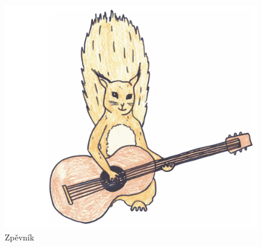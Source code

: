 \documentclass[a5paper, 10pt, onecolumn]{article}
\begin{document}



\begin{titlepage}
	\begin{figure}[h!]
	\begin{center}
		\includegraphics[scale=0.5]{veverka.pdf}\\
		\vspace{5em}
		{\fontsize{80}{90}\Fontskrivan\selectfont Zpěvník}
	\end{center}
	\end{figure}
\end{titlepage}
\end{document}
